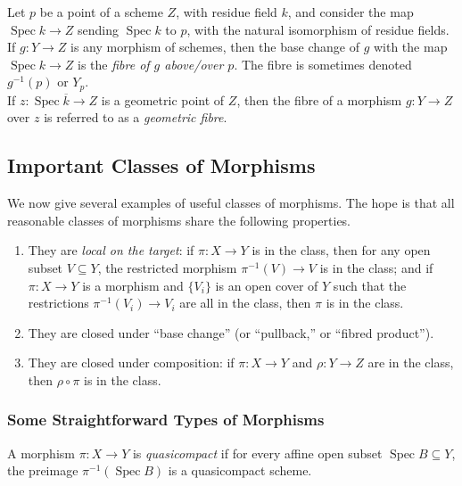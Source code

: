 \documentclass[11pt,openany]{book} %
\newcommand{\spc}{\operatorname{Spec}}
\begin{document}
\begin{definition}
Let $p$ be a point of a scheme $Z$, with residue field $k$, and consider the map $\spc k \to Z$ sending $\spc k$ to $p$, with the natural isomorphism of residue fields. If $g : Y \to Z$ is any morphism of schemes, then the base change of $g$ with the map $\spc k \to Z$ is the \emph{fibre of $g$ above/over $p$}. The fibre is sometimes denoted $g^{-1}(p)$ or $Y_p$.\\

If $z : \spc \overline{k} \to Z$ is a geometric point of $Z$, then the fibre of a morphism $g : Y \to Z$ over $z$ is referred to as a \emph{geometric fibre}.
\end{definition}

\subsection{Important Classes of Morphisms}
We now give several examples of useful classes of morphisms. The hope is that all reasonable classes of morphisms share the following properties.
\begin{enumerate}[label=(\roman*)]
	\item They are \emph{local on the target}: if $\pi : X \to Y$ is in the class, then for any open subset $V \subseteq Y$, the restricted morphism $\pi^{-1}(V) \to V$ is in the class; and if $\pi : X \to Y$ is a morphism and $\{V_i\}$ is an open cover of $Y$ such that the restrictions $\pi^{-1}(V_i) \to V_i$ are all in the class, then $\pi$ is in the class.
    \item They are closed under ``base change'' (or ``pullback,'' or ``fibred product'').
    \item They are closed under composition: if $\pi : X \to Y$ and $\rho : Y \to Z$ are in the class, then $\rho \circ \pi$ is in the class.
\end{enumerate}


\subsubsection{Some Straightforward Types of Morphisms}
\begin{definition}
A morphism $\pi : X \to Y$ is \emph{quasicompact} if for every affine open subset $\spc B \subseteq Y$, the preimage $\pi^{-1}(\spc B)$ is a quasicompact scheme.
\end{definition}
\end{document}

